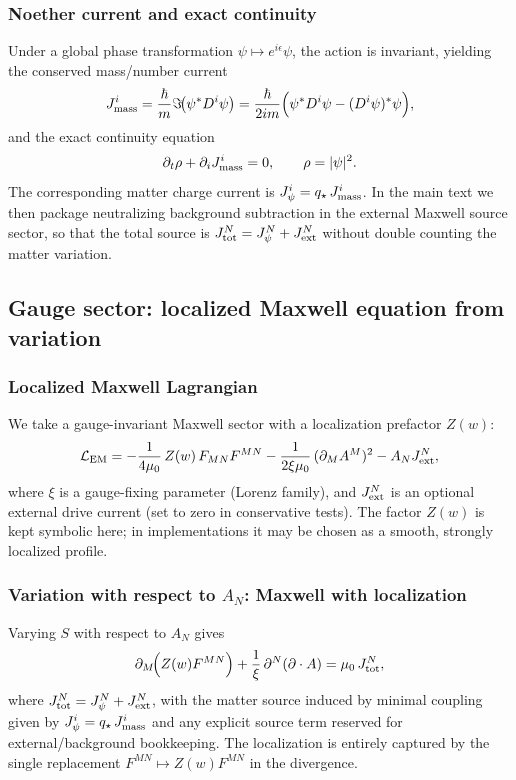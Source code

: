 \documentclass[11pt]{article}
\newcommand{\qstar}{q_\star}
\begin{document}
\subsubsection{Noether current and exact continuity}
Under a global phase transformation $\psi\mapsto e^{i\epsilon}\psi$, the action is
invariant, yielding the conserved mass/number current
\begin{align}
J^i_{\rm mass}
=\frac{\hbar}{m}\Im\!\big(\psi^\ast D^i\psi\big)
=\frac{\hbar}{2im}\Big(\psi^\ast D^i\psi - (D^i\psi)^\ast\psi\Big),
\label{eq:current_def}
\end{align}
and the exact continuity equation
\begin{align}
\partial_t\rho+\partial_i J^i_{\rm mass}=0,
\qquad \rho=|\psi|^2.
\label{eq:continuity_4d}
\end{align}
The corresponding matter charge current is $J^i_{\psi}=\qstar\,J^i_{\rm mass}$. In the main
text we then package neutralizing background subtraction in the external Maxwell
source sector, so that the total source is $J^N_{\rm tot}=J^N_{\psi}+J^N_{\rm ext}$ without double counting the matter variation.

\subsection{Gauge sector: localized Maxwell equation from variation}
\subsubsection{Localized Maxwell Lagrangian}
We take a gauge-invariant Maxwell sector with a localization prefactor $Z(w)$:
\begin{align}
\mathcal{L}_{\rm EM}
=
-\frac{1}{4\mu_0}\,Z(w)\,F_{MN}F^{MN}
-\frac{1}{2\xi\mu_0}\,(\partial_M A^M)^2
- A_N J^N_{\rm ext},
\label{eq:LEM}
\end{align}
where $\xi$ is a gauge-fixing parameter (Lorenz family), and $J^N_{\rm ext}$ is an
optional external drive current (set to zero in conservative tests).  The factor
$Z(w)$ is kept symbolic here; in implementations it may be chosen as a smooth,
strongly localized profile.

\subsubsection{Variation with respect to $A_N$: Maxwell with localization}
Varying $S$ with respect to $A_N$ gives
\begin{align}
\partial_M\!\Big(Z(w)F^{MN}\Big)
+\frac{1}{\xi}\,\partial^N(\partial\cdot A)
=
\mu_0\,J^N_{\rm tot},
\label{eq:maxwell_localized}
\end{align}
where $J^N_{\rm tot}=J^N_{\psi}+J^N_{\rm ext}$, with the matter source induced by minimal coupling given by $J^i_{\psi}=\qstar\,J^i_{\rm mass}$ and any explicit source term reserved for external/background bookkeeping. The localization is entirely captured by the single replacement $F^{MN}\mapsto Z(w)F^{MN}$ in the divergence.
\end{document}

